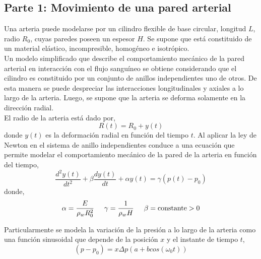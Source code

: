 
\subsection{Parte 1: Movimiento de una pared arterial}

Una arteria puede modelarse por un cilindro flexible de base circular, longitud $L$, radio $R_0$, cuyas paredes poseen un espesor $H$. Se supone que está constituido de un material elástico, incompresible, homogéneo e isotrópico. \\

Un modelo simplificado que describe el comportamiento mecánico de la pared arterial en interacción con el flujo sanguíneo se obtiene considerando que el cilindro es constituido por un conjunto de anillos independientes uno de otros. De esta manera se puede despreciar las interacciones longitudinales y axiales a lo largo de la arteria. Luego, se supone que la arteria se deforma solamente en la dirección radial. \\

El radio de la arteria está dado por,
\begin{equation}
R(t) = R_0 + y(t)
\end{equation}
donde $y(t)$ es la deformación radial en función del tiempo $t$. Al aplicar la ley de Newton en el sistema de anillo independientes conduce a una ecuación que permite modelar el comportamiento mecánico de la pared de la arteria en función del tiempo,
\begin{equation} \label{PROBLEMA_PARTE2}
\dfrac{d^2 y(t)}{dt^2} + \beta \dfrac{dy(t)}{dt} + \alpha y(t) = \gamma (p(t)-p_0)
\end{equation}
donde,
\begin{equation}
\alpha = \dfrac{E}{\rho_w R^2_0} \hspace{0,5cm} \gamma = \dfrac{1}{\rho_w H} \hspace{0,5cm} \beta = \mbox{constante} > 0 
\end{equation}

Particularmente se modela la variación de la presión a lo largo de la arteria como una función sinusoidal que depende de la posición $x$ y el instante de tiempo $t$,
\begin{equation} \label{FUENTE_PARTE2}
(p-p_0) = x \Delta p  \left( a + b cos( \omega_0 t ) \right)
\end{equation} 


